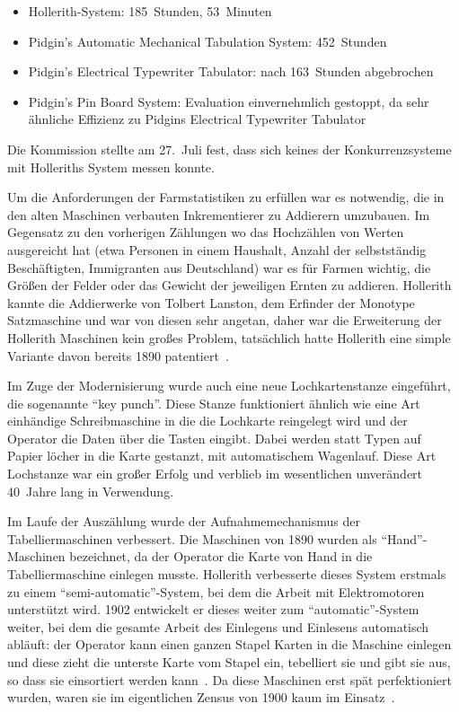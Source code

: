 \documentclass[parskip=half]{scrartcl}
\begin{document}
\begin{itemize}
  \item Hollerith-System: 185~Stunden, 53~Minuten
  \item Pidgin's Automatic Mechanical Tabulation System: 452~Stunden
  \item Pidgin's Electrical Typewriter Tabulator: nach 163~Stunden abgebrochen
  \item Pidgin's Pin Board System: Evaluation einvernehmlich gestoppt, da sehr
    ähnliche Effizienz zu Pidgins Electrical Typewriter Tabulator
\end{itemize}

Die Kommission stellte am 27.~Juli fest, dass sich keines der Konkurrenzsysteme
mit Holleriths System messen konnte.

Um die Anforderungen der Farmstatistiken zu erfüllen war es notwendig, die in
den alten Maschinen verbauten Inkrementierer zu Addierern umzubauen. Im
Gegensatz zu den vorherigen Zählungen wo das Hochzählen von Werten ausgereicht
hat (etwa Personen in einem Haushalt, Anzahl der selbstständig Beschäftigten,
Immigranten aus Deutschland) war es für Farmen wichtig, die Größen der Felder
oder das Gewicht der jeweiligen Ernten zu addieren. Hollerith kannte die
Addierwerke von Tolbert Lanston, dem Erfinder der Monotype Satzmaschine und war
von diesen sehr angetan, daher war die Erweiterung der Hollerith Maschinen kein
großes Problem, tatsächlich hatte Hollerith eine simple Variante davon bereits
1890 patentiert~\cite{truesdell1965development}.

Im Zuge der Modernisierung wurde auch eine neue Lochkartenstanze eingeführt,
die sogenannte \enquote{key punch}. Diese Stanze funktioniert ähnlich wie eine
Art einhändige Schreibmaschine in die die Lochkarte reingelegt wird und der
Operator die Daten über die Tasten eingibt. Dabei werden statt Typen auf Papier
löcher in die Karte gestanzt, mit automatischem Wagenlauf. Diese Art Lochstanze
war ein großer Erfolg und verblieb im wesentlichen unverändert 40~Jahre lang in
Verwendung.

Im Laufe der Auszählung wurde der Aufnahmemechanismus der Tabelliermaschinen
verbessert. Die Maschinen von 1890 wurden als \enquote{Hand}-Maschinen
bezeichnet, da der Operator die Karte von Hand in die Tabelliermaschine
einlegen musste. Hollerith verbesserte dieses System erstmals zu einem
\enquote{semi-automatic}-System, bei dem die Arbeit mit Elektromotoren
unterstützt wird. 1902 entwickelt er dieses weiter zum
\enquote{automatic}-System weiter, bei dem die gesamte Arbeit des Einlegens und
Einlesens automatisch abläuft: der Operator kann einen ganzen Stapel Karten in
die Maschine einlegen und diese zieht die unterste Karte vom Stapel ein,
tebelliert sie und gibt sie aus, so dass sie einsortiert werden
kann~\cite{austrian1982herman}. Da diese Maschinen erst spät perfektioniert
wurden, waren sie im eigentlichen Zensus von 1900 kaum im
Einsatz~\cite{truesdell1965development}.
\end{document}
